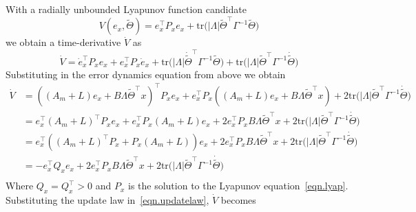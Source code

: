 \documentclass[]{../sty/aiaa-tc}
\theoremstyle{examplestyle}
\begin{document}
  \begin{proof-dan}
    With a radially unbounded Lyapunov function candidate
    \begin{equation}
      \label{eqn.lyapfunction}
      V(e_{x},\widetilde{\Theta}) = e_{x}^{\top}P_{x}e_{x}+\text{tr}\bigr(|\Lambda|\widetilde{\Theta}^{\top}\Gamma^{-1}\widetilde{\Theta}\bigr)
    \end{equation}
    we obtain a time-derivative $\dot{V}$ as
    \begin{equation*}
      \dot{V}=\dot{e}_{x}^{\top}P_{x}e_{x}
      + e_{x}^{\top}P_{x}\dot{e}_{x}
      + \text{tr}\bigr(|\Lambda|\dot{\widetilde{\Theta}}^{\top}\Gamma^{-1}\widetilde{\Theta}\bigr)
      + \text{tr}\bigr(|\Lambda|\widetilde{\Theta}^{\top}\Gamma^{-1}\dot{\widetilde{\Theta}}\bigr)
    \end{equation*}
    Substituting in the error dynamics equation from above we obtain
    \begin{equation*}
      \begin{split}
        \dot{V}
        &=
        ((A_{m}+L)e_{x}+B\Lambda\widetilde{\Theta}^{\top}x)^{\top}P_{x}e_{x}
        + e_{x}^{\top}P_{x}((A_{m}+L)e_{x}+B\Lambda\widetilde{\Theta}^{\top}x)
        + 2\text{tr}\bigr(|\Lambda|\widetilde{\Theta}^{\top}\Gamma^{-1}\dot{\widetilde{\Theta}}\bigr) \\
        &=
        e_{x}^{\top}(A_{m}+L)^{\top}P_{x}e_{x}+e_{x}^{\top}P_{x}(A_{m}+L)e_{x}
        + 2e_{x}^{\top}P_{x}B\Lambda\widetilde{\Theta}^{\top}x
        + 2\text{tr}\bigr(|\Lambda|\widetilde{\Theta}^{\top}\Gamma^{-1}\dot{\widetilde{\Theta}}\bigr) \\
        &=
        e_{x}^{\top}((A_{m}+L)^{\top}P_{x}+P_{x}(A_{m}+L))e_{x}
        + 2e_{x}^{\top}P_{x}B\Lambda\widetilde{\Theta}^{\top}x
        + 2\text{tr}\bigr(|\Lambda|\widetilde{\Theta}^{\top}\Gamma^{-1}\dot{\widetilde{\Theta}}\bigr) \\
        &=
        - e_{x}^{\top}Q_{x}e_{x}
        + 2e_{x}^{\top}P_{x}B\Lambda\widetilde{\Theta}^{\top}x
        + 2\text{tr}\bigr(|\Lambda|\widetilde{\Theta}^{\top}\Gamma^{-1}\dot{\widetilde{\Theta}}\bigr) \\
      \end{split}
    \end{equation*}
    Where $Q_{x}=Q_{x}^{\top}>0$ and $P_{x}$ is the solution to the Lyapunov equation\ \eqref{eqn.lyap}.
    Substituting the update law in\ \eqref{eqn.updatelaw}, $\dot{V}$ becomes
    \begin{equation*}

\end{equation*}
\end{proof-dan}
\end{document}
